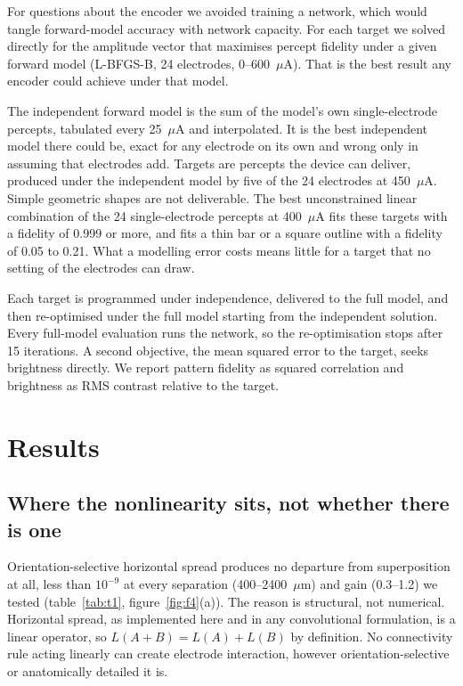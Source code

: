 \documentclass[10pt,twocolumn]{article}
\newcommand{\um}{\ensuremath{\mu\text{m}}}
\newcommand{\uA}{\ensuremath{\mu\text{A}}}
\begin{document}
For questions about the encoder we avoided training a network, which would
tangle forward-model accuracy with network capacity. For each target we
solved directly for the amplitude vector that maximises percept fidelity
under a given forward model (L-BFGS-B, 24 electrodes, 0--600~\uA). That is
the best result any encoder could achieve under that model.

The independent forward model is the sum of the model's own
single-electrode percepts, tabulated every 25~\uA{} and interpolated. It is
the best independent model there could be, exact for any electrode on its
own and wrong only in assuming that electrodes add. Targets are percepts
the device can deliver, produced under the independent model by five of
the 24 electrodes at 450~\uA. Simple geometric shapes are not deliverable.
The best unconstrained linear combination of the 24 single-electrode
percepts at 400~\uA{} fits these targets with a fidelity of 0.999 or more,
and fits a thin bar or a square outline with a fidelity of 0.05 to 0.21.
What a modelling error costs means little for a target that no setting of
the electrodes can draw.

Each target is programmed under independence, delivered to the full model,
and then re-optimised under the full model starting from the independent
solution. Every full-model evaluation runs the network, so the
re-optimisation stops after 15 iterations. A second objective, the mean
squared error to the target, seeks brightness directly. We report pattern
fidelity as squared correlation and brightness as RMS contrast relative to
the target.

\section{Results}

\subsection{Where the nonlinearity sits, not whether there is one}
\label{sec:structure}

Orientation-selective horizontal spread produces no departure from
superposition at all, less than $10^{-9}$ at every separation
(400--2400~\um) and gain (0.3--1.2) we tested (table~\ref{tab:t1},
figure~\ref{fig:f4}(a)). The reason is structural, not numerical.
Horizontal spread, as implemented here and in any convolutional
formulation, is a linear operator, so $L(A+B) = L(A) + L(B)$ by
definition. No connectivity rule acting linearly can create electrode
interaction, however orientation-selective or anatomically detailed it is.
\end{document}
